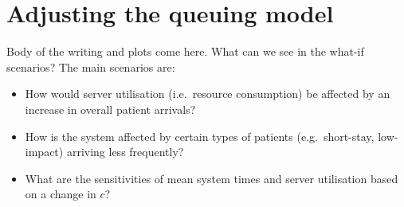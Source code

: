 \section{Adjusting the queuing model}\label{sec:scenarios}

Body of the writing and plots come here. What can we see in the what-if
scenarios? The main scenarios are:

\begin{itemize}
    \item How would server utilisation (i.e.\ resource consumption) be affected
        by an increase in overall patient arrivals?
    \item How is the system affected by certain types of patients (e.g.\
        short-stay, low-impact) arriving less frequently?
    \item What are the sensitivities of mean system times and server utilisation
        based on a change in \(c\)?
\end{itemize}
